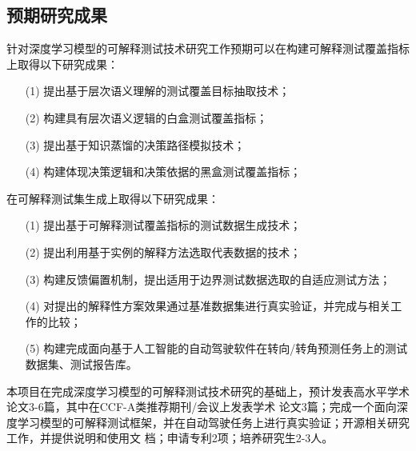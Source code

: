 \subsection{预期研究成果}

针对深度学习模型的可解释测试技术研究工作预期可以在构建可解释测试覆盖指标上取得以下研究成果：
\begin{itemize}[itemindent=2em]
    \item[(1)] 提出基于层次语义理解的测试覆盖目标抽取技术；
    \item[(2)] 构建具有层次语义逻辑的白盒测试覆盖指标；
    \item[(3)] 提出基于知识蒸馏的决策路径模拟技术；
    \item[(4)] 构建体现决策逻辑和决策依据的黑盒测试覆盖指标；
\end{itemize}

在可解释测试集生成上取得以下研究成果：
\begin{itemize}[itemindent=2em]
    \item[(1)] 提出基于可解释测试覆盖指标的测试数据生成技术；
    \item[(2)] 提出利用基于实例的解释方法选取代表数据的技术；
    \item[(3)] 构建反馈偏置机制，提出适用于边界测试数据选取的自适应测试方法；
    \item[(4)] 对提出的解释性方案效果通过基准数据集进行真实验证，并完成与相关工作的比较；
    \item[(5)] 构建完成面向基于人工智能的自动驾驶软件在转向/转角预测任务上的测试数据集、测试报告库。
\end{itemize}

本项目在完成深度学习模型的可解释测试技术研究的基础上，预计发表高水平学术论文3-6篇，其中在CCF-A类推荐期刊/会议上发表学术
论文3篇；完成一个面向深度学习模型的可解释测试框架，并在自动驾驶任务上进行真实验证；开源相关研究工作，并提供说明和使用文
档；申请专利2项；培养研究生2-3人。
